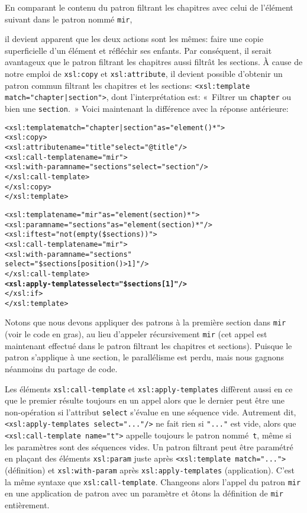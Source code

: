 En comparant le contenu du patron filtrant les chapitres avec celui de
l'élément suivant dans le patron nommé \texttt{mir},
il devient apparent que les deux actions sont les mêmes: faire une
copie superficielle d'un élément et réfléchir ses enfants. Par
conséquent, il serait avantageux que le patron filtrant les chapitres
aussi filtrât les sections. À cause de notre emploi de
\texttt{xsl:copy} et \texttt{xsl:attribute}, il devient possible
d'obtenir un patron commun filtrant les chapitres et les sections:
\texttt{<xsl:template match="chapter|section">}, dont l'interprétation
est: «~Filtrer un \texttt{chapter} ou bien une \texttt{section}.~» Voici
maintenant la différence avec la réponse antérieure:
\begin{alltt}
\small  <xsl:template match="chapter|section" as="element()*">
    <xsl:copy>
      <xsl:attribute name="title" select="@title"/>
      <xsl:call-template name="mir">
        <xsl:with-param name="sections" select="section"/>
      </xsl:call-template>
    </xsl:copy>
  </xsl:template>

  <xsl:template name="mir" as="element(section)*">
    <xsl:param name="sections" as="element(section)*"/>
    <xsl:if test="not(empty(\$sections))">
      <xsl:call-template name="mir">
        <xsl:with-param name="sections"
                        select="\$sections[position()>1]"/>
      </xsl:call-template>
      \textbf{<xsl:apply-templates select="\$sections[1]"/>}
    </xsl:if>
  </xsl:template>
\end{alltt}
Notons que nous devons appliquer des patrons à la première section
dans \texttt{mir} (voir le code en gras), au lieu d'appeler
récursivement \texttt{mir} (cet appel est maintenant effectué dans le
patron filtrant les chapitres et sections). Puisque le patron
s'applique à une section, le parallélisme est perdu, mais nous gagnons
néanmoins du partage de code.

Les éléments \texttt{xsl:call-template} et
\texttt{xsl:apply-templates} diffèrent aussi en ce que le premier
résulte toujours en un appel alors que le dernier peut être une
non-opération si l'attribut \texttt{select} s'évalue en une séquence
vide. Autrement dit, \texttt{<xsl:apply-templates select="..."/>} ne
fait rien si \texttt{"..."} est vide, alors que
\texttt{<xsl:call-template name="t">} appelle toujours le patron
nommé~\texttt{t}, même si les paramètres sont des séquences vides. Un
patron filtrant peut être paramétré en plaçant des éléments
\texttt{xsl:param} juste après \texttt{<xsl:template match="...">}
(définition) et \texttt{xsl:with-param} après
\texttt{xsl:apply-templates} (application). C'est la même syntaxe que
\texttt{xsl:call-template}. Changeons alors l'appel du patron
\texttt{mir} en une application de patron avec un paramètre et ôtons
la définition de \texttt{mir} entièrement.

